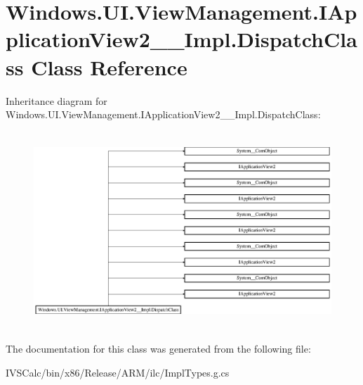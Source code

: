 \hypertarget{class_windows_1_1_u_i_1_1_view_management_1_1_i_application_view2_____impl_1_1_dispatch_class}{}\section{Windows.\+U\+I.\+View\+Management.\+I\+Application\+View2\+\_\+\+\_\+\+Impl.\+Dispatch\+Class Class Reference}
\label{class_windows_1_1_u_i_1_1_view_management_1_1_i_application_view2_____impl_1_1_dispatch_class}
Inheritance diagram for Windows.\+U\+I.\+View\+Management.\+I\+Application\+View2\+\_\+\+\_\+\+Impl.\+Dispatch\+Class\+:\begin{figure}[H]
\begin{center}
\leavevmode
\includegraphics[height=7.439613cm]{class_windows_1_1_u_i_1_1_view_management_1_1_i_application_view2_____impl_1_1_dispatch_class}
\end{center}
\end{figure}


The documentation for this class was generated from the following file\+:\begin{DoxyCompactItemize}
\item 
I\+V\+S\+Calc/bin/x86/\+Release/\+A\+R\+M/ilc/Impl\+Types.\+g.\+cs\end{DoxyCompactItemize}
